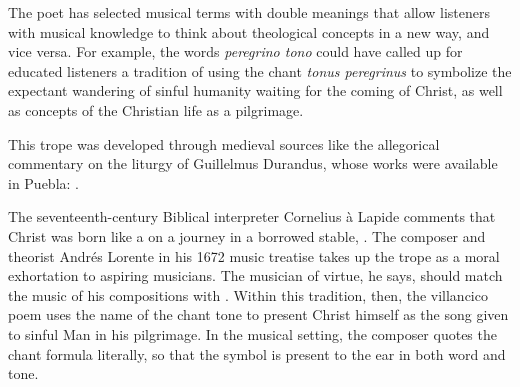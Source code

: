The poet has selected musical terms with double meanings that allow listeners
with musical knowledge to think about theological concepts in a new way, and
vice versa.
For example, the words \emph{peregrino tono} could have called up for educated
listeners a tradition of using the chant \emph{tonus peregrinus} to symbolize
the expectant wandering of sinful humanity waiting for the coming of Christ, as
well as concepts of the Christian life as a pilgrimage.%
\begin{Footnote}
    This trope was developed through medieval sources like the allegorical
    commentary on the liturgy of Guillelmus Durandus, whose works were available
    in Puebla: \autocite[234]{Wright:Maze}.
\end{Footnote}
The seventeenth-century Biblical interpreter Cornelius à Lapide comments that
Christ was born like a   on a journey in
a borrowed stable, .
    \Autocites
    [884, on :
    .]
    {Lapide:Gospels19C}
    [669, on : 
    .] 
    {Lapide:Gospels19C}
The composer and theorist Andrés Lorente in his 1672 music treatise takes up the
 trope as a moral exhortation to aspiring musicians.
The musician of virtue, he says, should match the music of his compositions with
.%
    \Autocite[609]{Lorente:Porque}
Within this tradition, then, the villancico poem uses the name of the chant tone
to present Christ himself as the song given to sinful Man in his pilgrimage. 
In the musical setting, the composer quotes the chant formula literally, so that
the symbol is present to the ear in both word and tone.


